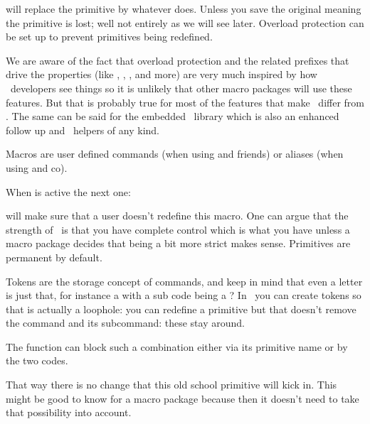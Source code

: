 will replace the primitive by whatever  does. Unless you save
the original meaning the primitive is lost; well not entirely as we will see
later. Overload protection can be set up to prevent primitives being redefined.

We are aware of the fact that overload protection and the related prefixes that
drive the properties (like , , ,
 and more) are very much inspired by how \CONTEXT\ developers see
things so it is unlikely that other macro packages will use these features. But
that is probably true for most of the features that make \LUAMETATEX\ differ from
\LUATEX. The same can be said for the embedded \METAPOST\ library which is also
an enhanced follow up and \LUA\ helpers of any kind.


\stopsection

\startsection[title=Macros]

Macros are user defined commands (when using  and friends) or aliases
(when using  and co).

\starttyping[option=TEX]
\stoptyping

When  is active the next one:

\starttyping[option=TEX]
\permanent{}
\stoptyping

will make sure that a user doesn't redefine this macro. One can argue that the
strength of \TEX\ is that you have complete control which is what you have unless
a macro package decides that being a bit more strict makes sense. Primitives are
permanent by default.

\stopsection

\startsection[title=Tokens]

Tokens are the storage concept of commands, and keep in mind that even a letter
is just that, for instance a  with a sub code being a \UNICODE
? In \LUA\ you can create tokens so that is actually a loophole: you can redefine
a primitive but that doesn't remove the command and its subcommand: these stay
around.

The  function can block such a combination either
via its primitive name or by the two codes.

\starttyping
{}
\stoptyping

That way there is no change that this old school primitive will kick in. This
might be good to know for a macro package because then it doesn't need to take
that possibility into account.

